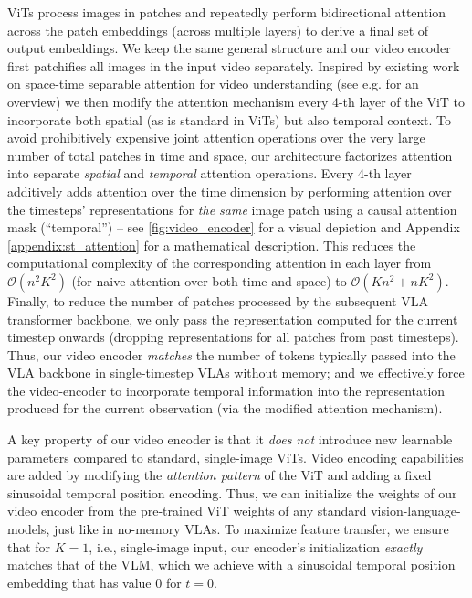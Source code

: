 ViTs process images in patches and repeatedly perform bidirectional attention across the patch embeddings (across multiple layers) to derive a final set of output embeddings.
We keep the same general structure and our video encoder first patchifies all images in the input video separately. Inspired by existing work on space-time separable attention for video understanding (see e.g. \citet{bertasius2021space} for an overview) we then modify the attention mechanism every 4-th layer of the ViT to incorporate both spatial (as is standard in ViTs) but also temporal context. To avoid prohibitively expensive joint attention operations over the very large number of total patches in time and space, our architecture factorizes attention into separate \emph{spatial} and \emph{temporal} attention operations.
Every 4-th layer additively adds attention over the time dimension by performing attention over the timesteps' representations for \emph{the same} image patch using a causal attention mask (``temporal'') -- see \cref{fig:video_encoder} for a visual depiction and Appendix \ref{appendix:st_attention} for a mathematical description. 
This reduces the computational complexity of the corresponding attention in each layer from $\mathcal{O}(n^2K^2)$ (for naive attention over both time and space) to $\mathcal{O}(Kn^2 + n K^2)$.
Finally, to reduce the number of patches processed by the subsequent VLA transformer backbone, we only pass the representation computed for the current timestep onwards (dropping representations for all patches from past timesteps).
Thus, our video encoder \emph{matches} the number of tokens typically passed into the VLA backbone in single-timestep VLAs without memory; and we effectively force the video-encoder to incorporate temporal information into the representation produced for the current observation (via the modified attention mechanism).

A key property of our video encoder is that it \emph{does not} introduce new learnable parameters compared to standard, single-image ViTs. Video encoding capabilities are added by modifying the \emph{attention pattern} of the ViT and adding a fixed sinusoidal temporal position encoding. Thus, we can initialize the weights of our video encoder from the pre-trained ViT weights of any standard vision-language-models, just like in no-memory VLAs.
To maximize feature transfer, we ensure that for $K = 1$, i.e., single-image input, our encoder's initialization \emph{exactly} matches that of the VLM, which we achieve with a sinusoidal temporal position embedding that has value $0$ for $t = 0$.

